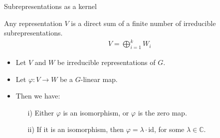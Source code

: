 \documentclass[10pt]{beamer}
\newcommand{\id}{\text{id}}
\newcommand{\CC}{\mathbb{C}}
\begin{document}
	\begin{frame}{Subrepresentations as a kernel}
		\begin{corollary}
			Any representation $V$ is a direct sum of a finite number of irreducible subrepresentations. \begin{align*}
				V = \bigoplus_{i=1}^k W_i
			\end{align*}
		\end{corollary}\pause
%				
%				
				
		\begin{theorem}
			\begin{itemize}
				\item Let $V$ and $W$ be irreducible representations of $G$.
				\item Let $\varphi: V \rightarrow W$ be a $G$-linear map.\pause
				\item Then we have: 
				\begin{itemize}
					\item[i)] Either $\varphi$ is an isomorphism, or $\varphi$ is the zero map.\pause
					\item[ii)] If it is an isomorphism, then $\varphi = \lambda \cdot \id$, for some $\lambda \in \CC$.
				\end{itemize}
				
			\end{itemize}
		\end{theorem}
	\end{frame}
\end{document}
